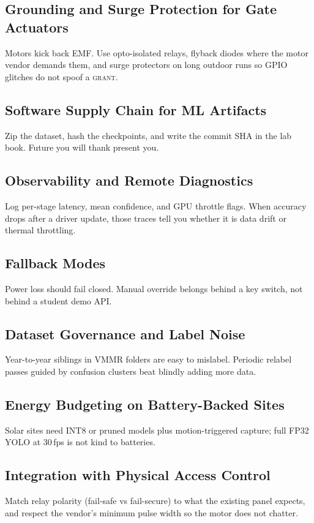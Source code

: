 \documentclass[10pt, conference]{IEEEtran}
\begin{document}
\subsection{Grounding and Surge Protection for Gate Actuators}
Motors kick back EMF. Use opto-isolated relays, flyback diodes where the motor vendor demands them, and surge protectors on long outdoor runs so GPIO glitches do not spoof a \textsc{grant}.

\subsection{Software Supply Chain for ML Artifacts}
Zip the dataset, hash the checkpoints, and write the commit SHA in the lab book. Future you will thank present you.

\subsection{Observability and Remote Diagnostics}
Log per-stage latency, mean confidence, and GPU throttle flags. When accuracy drops after a driver update, those traces tell you whether it is data drift or thermal throttling.

\subsection{Fallback Modes}
Power loss should fail closed. Manual override belongs behind a key switch, not behind a student demo API.

\subsection{Dataset Governance and Label Noise}
Year-to-year siblings in VMMR folders are easy to mislabel. Periodic relabel passes guided by confusion clusters beat blindly adding more data.

\subsection{Energy Budgeting on Battery-Backed Sites}
Solar sites need INT8 or pruned models plus motion-triggered capture; full FP32 YOLO at 30\,fps is not kind to batteries.

\subsection{Integration with Physical Access Control}
Match relay polarity (fail-safe vs fail-secure) to what the existing panel expects, and respect the vendor's minimum pulse width so the motor does not chatter.
\end{document}
